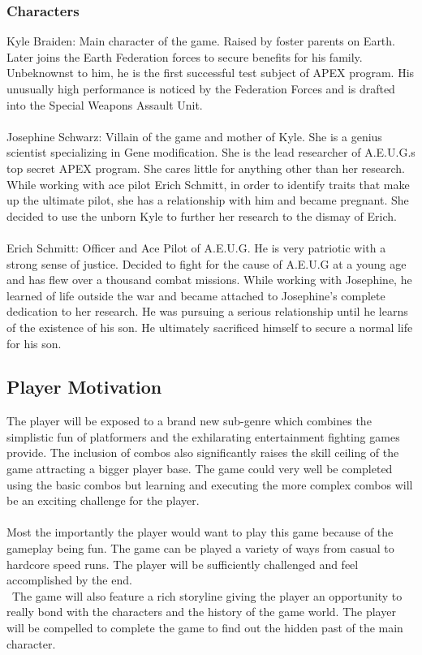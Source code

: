 \documentclass{article}
\begin{document}
    \subsubsection*{Characters}
    Kyle Braiden: Main character of the game. Raised by foster parents on Earth. Later joins the Earth Federation forces to secure benefits for his family. Unbeknownst to him, he is the first successful test subject of APEX program. His unusually high performance is noticed by the Federation Forces and is drafted into the Special Weapons Assault Unit.\\\\
    Josephine Schwarz: Villain of the game and mother of Kyle. She is a genius scientist specializing in Gene modification. She is the lead researcher of A.E.U.G.s top secret APEX program. She cares little for anything other than her research. While working with ace pilot Erich Schmitt, in order to identify traits that make up the ultimate pilot, she has a relationship with him and became pregnant. She decided to use the unborn Kyle to further her research to the dismay of Erich.\\\\
    Erich Schmitt: Officer and Ace Pilot of A.E.U.G. He is very patriotic with a strong sense of justice. Decided to fight for the cause of A.E.U.G at a young age and has flew over a thousand combat missions. While working with Josephine, he learned of life outside the war and became attached to Josephine’s complete dedication to her research. He was pursuing a serious relationship until he learns of the existence of his son. He ultimately sacrificed himself to secure a normal life for his son.
    
\subsection*{Player Motivation}
The player will be exposed to a brand new sub-genre which combines the simplistic fun of platformers and the exhilarating entertainment fighting games provide. The inclusion of combos also significantly raises the skill ceiling of the game attracting a bigger player base. The game could very well be completed using the basic combos but learning and executing the more complex combos will be an exciting challenge for the player.\\\\
Most the importantly the player would want to play this game because of the gameplay being fun. The game can be played a variety of ways from casual to hardcore speed runs. The player will be sufficiently challenged and feel accomplished by the end.\\\
 The game will also feature a rich storyline giving the player an opportunity to really bond with the characters and the history of the game world. The player will be compelled to complete the game to find out the hidden past of the main character. \\\\
\end{document}
